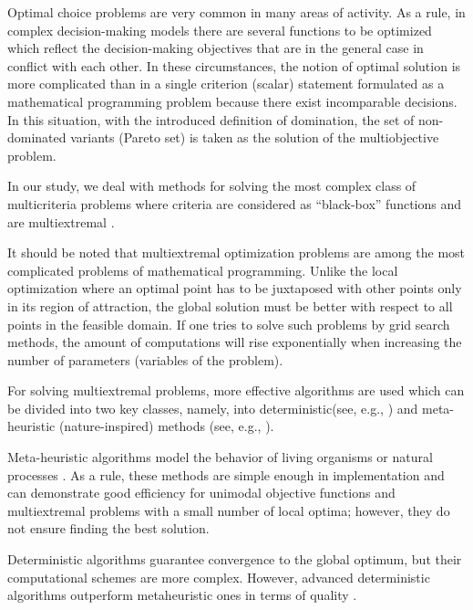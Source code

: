 \documentclass[runningheads]{llncs}
\begin{document}
Optimal choice problems are very common in many areas of activity. As a rule, in complex decision-making models there are several functions to be optimized which reflect the decision-making objectives that are in the general case in conflict with each other. In these circumstances, the notion of optimal solution is more complicated than in a single criterion (scalar) statement formulated as a mathematical programming problem because there exist incomparable decisions. In this situation, with the introduced definition of domination, the set of non-dominated variants (Pareto set) is taken as the solution of the multiobjective problem.

In our study, we deal with methods for solving the most complex class of multicriteria problems where criteria are considered as ``black-box'' functions and are multiextremal \cite{Miettinen1999,Ehrgott2005,Pardalos2017,Strongin2000,Sergeyev2013}.

It should be noted that multiextremal optimization problems are among the most complicated problems of mathematical programming. Unlike the local optimization where an optimal point has to be juxtaposed with other points only in its region of attraction, the global solution must be better with respect to all points in the feasible domain. If one tries to solve such problems by grid search methods, the amount of computations will rise exponentially when increasing the number of parameters (variables of the problem).

For solving multiextremal problems, more effective algorithms are used which can be divided into two key classes, namely, into deterministic(see, e.g., \cite{Evtushenko2014,Gergel2018,GergelKozinov2020,Paulavicius2020,Jones2021}) and meta-heuristic (nature-inspired) methods (see, e.g., \cite{Battiti2009,Gendreau2010,Eiben2015}).

Meta-heuristic algorithms model the behavior of living organisms or natural processes \cite{Deb2002,Durillo2010,Mostaghim2007,NDG09,RC05,ZLT01}. As a rule, these methods are simple enough in implementation and can demonstrate good efficiency for unimodal objective functions and multiextremal problems with a small number of local optima; however, they do not ensure finding the best solution.

Deterministic algorithms guarantee convergence to the global optimum, but their computational schemes are more complex. However, advanced deterministic algorithms outperform metaheuristic ones in terms of quality \cite{Kvasov2018,Sergeyev2018}.
\end{document}
